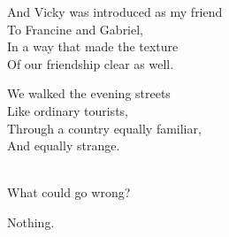 \begin{lyrics}
And Vicky was introduced as my friend\\
To Francine and Gabriel,\\
In a way that made the texture\\
Of our friendship clear as well.

We walked the evening streets\\
Like ordinary tourists,\\
Through a country equally familiar,\\
And equally strange.

\\
What could go wrong?

Nothing.
\end{lyrics}

